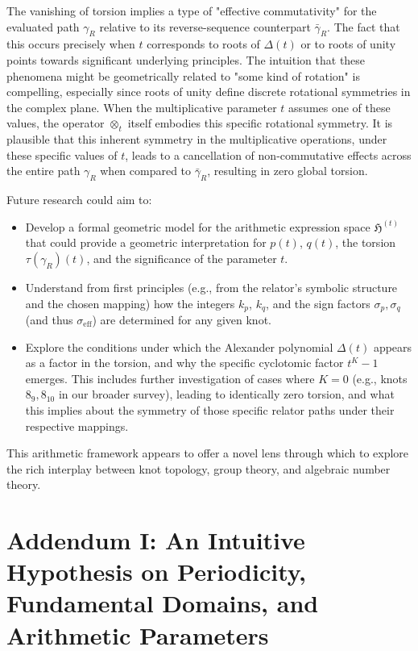 \documentclass{article}[a4paper,12pt]
\begin{document}
The vanishing of torsion implies a type of "effective commutativity" for the evaluated path $\gamma_R$ relative to its reverse-sequence counterpart $\bar{\gamma}_R$. The fact that this occurs precisely when $t$ corresponds to roots of $\Delta(t)$ or to roots of unity points towards significant underlying principles. The intuition that these phenomena might be geometrically related to "some kind of rotation" is compelling, especially since roots of unity define discrete rotational symmetries in the complex plane. When the multiplicative parameter $t$ assumes one of these values, the operator $\otimes_t$ itself embodies this specific rotational symmetry. It is plausible that this inherent symmetry in the multiplicative operations, under these specific values of $t$, leads to a cancellation of non-commutative effects across the entire path $\gamma_R$ when compared to $\bar{\gamma}_R$, resulting in zero global torsion.

Future research could aim to:
\begin{itemize}
    \item Develop a formal geometric model for the arithmetic expression space $\mathfrak{H}^{(t)}$ that could provide a geometric interpretation for $p(t)$, $q(t)$, the torsion $\tau(\gamma_R)(t)$, and the significance of the parameter $t$.
    \item Understand from first principles (e.g., from the relator's symbolic structure and the chosen mapping) how the integers $k_p$, $k_q$, and the sign factors $\sigma_p, \sigma_q$ (and thus $\sigma_{\text{eff}}$) are determined for any given knot.
    \item Explore the conditions under which the Alexander polynomial $\Delta(t)$ appears as a factor in the torsion, and why the specific cyclotomic factor $t^K-1$ emerges. This includes further investigation of cases where $K=0$ (e.g., knots $8_9, 8_{10}$ in our broader survey), leading to identically zero torsion, and what this implies about the symmetry of those specific relator paths under their respective mappings.
\end{itemize}
This arithmetic framework appears to offer a novel lens through which to explore the rich interplay between knot topology, group theory, and algebraic number theory.

\newpage

\section{Addendum I: An Intuitive Hypothesis on Periodicity, Fundamental Domains, and Arithmetic Parameters}
\end{document}

